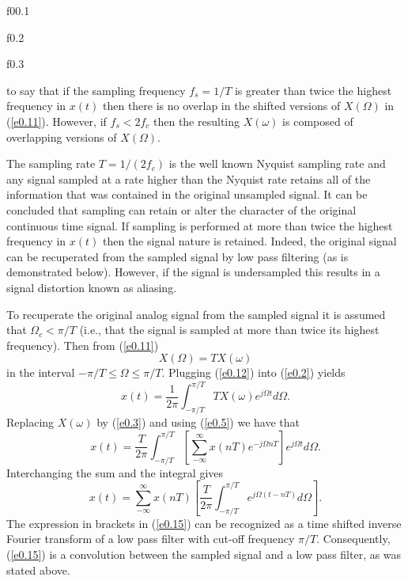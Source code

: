 %

{f00.1}

%

%

{f0.2}

%
%

{f0.3}

%
to say that if the sampling frequency $f_s=1/T$ is greater
than twice the highest frequency in $x(t)$ then there is
no overlap in the shifted versions of $X(\Omega)$
in (\ref{e0.11}).  However, if $f_s<2f_c$ then the resulting 
$X(\omega)$ is composed of overlapping versions of $X(\Omega)$.

	The sampling rate $T=1/(2f_c)$ is the well known
Nyquist sampling rate and any signal sampled at a rate higher 
than the Nyquist rate retains all of the information
that was contained in the original unsampled signal.
It can be concluded that sampling can retain
or alter the character of the original continuous time signal.
If sampling is performed at more than twice the highest frequency
in $x(t)$ then the signal nature is retained.  Indeed, the
original signal can be recuperated from the sampled signal
by low pass filtering (as is demonstrated below).  However,
if  the signal is undersampled this results in a signal
distortion known as aliasing.

	To recuperate the original analog signal from
the sampled signal it is assumed that $\Omega_c<\pi/T$ (i.e., that
the signal is sampled at more than twice its highest 
frequency).  Then from (\ref{e0.11})
%
\begin{equation}
X(\Omega)=TX(\omega)
\label{e0.12}
\end{equation}
%
in the interval $-\pi/T\le\Omega\le\pi/T$.  Plugging (\ref{e0.12})
into (\ref{e0.2}) yields
%
\begin{equation}
x(t)=\frac{1}{2\pi}\int_{-\pi/T}^{\pi/T}TX(\omega)e^{j\Omega t}d\Omega.
\label{e0.13}
\end{equation}
%
Replacing $X(\omega)$ by (\ref{e0.3}) and using (\ref{e0.5}) we have that
%
\begin{equation}
x(t)=\frac{T}{2\pi}\int_{-\pi/T}^{\pi/T}[
      \sum_{-\infty}^{\infty}x(nT)e^{-j\Omega nT}]e^{j\Omega t}d\Omega.
\label{e0.14}
\end{equation}
%
Interchanging the sum and the integral gives
%
\begin{equation}
x(t)=\sum_{-\infty}^{\infty}x(nT)
     [\frac{T}{2\pi}\int_{-\pi/T}^{\pi/T}
    e^{j\Omega(t- nT)}d\Omega].
\label{e0.15}
\end{equation}
%
The expression in brackets in (\ref{e0.15}) can be recognized as
a time shifted inverse Fourier transform of a low pass filter with
cut-off frequency $\pi/T$.  Consequently, (\ref{e0.15}) is a
convolution between the sampled signal and a low pass filter,
as was stated above.


